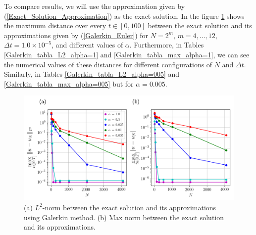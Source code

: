 		To compare results, we will use the approximation given by (\ref{Exact_Solution_Approximation}) as the exact solution. In the figure \ref{Galerkin_alphas} shows the maximum distance over every $t \in [0, 100]$ between the exact solution and its approximations given by (\ref{Galerkin_Euler}) for $N = 2^m$, $m = 4, \dots, 12$, $\Delta t = 1.0 \times 10^{-5}$, and different values of $\alpha$. Furthermore, in Tables \ref{Galerkin_tabla_L2_alpha=1} and \ref{Galerkin_tabla_max_alpha=1}, we can see the numerical values ​​of these distances for different configurations of $N$ and $\Delta t$. Similarly, in Tables \ref{Galerkin_tabla_L2_alpha=005} and \ref{Galerkin_tabla_max_alpha=005} but for $\alpha = 0.005$.
	
	\begin{figure}[H]
		\centering
		\includegraphics[width=15cm]{burgers_equation/deterministic/numerical_experiments/viscid/figures/galerkin/alphas_Error_N.png}
		\caption{(a) $L^2$-norm between the exact solution and its approximations using Galerkin method. (b) Max norm between the exact solution and its approximations.}
		\label{Galerkin_alphas}
	\end{figure}
	\newpage
